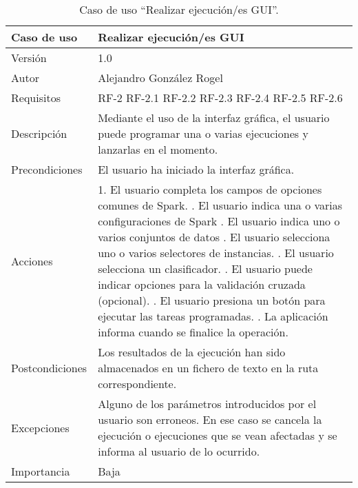  
\begin{table}
  \begin{center}
   \begin{tabular}{|>{} L{3cm} | L{9cm} |}
    \hline
    Caso de uso & Realizar ejecución/es GUI\\
    \hline
    Versión & 1.0 \\
    \hline
    Autor & Alejandro González Rogel \\
    \hline
    Requisitos & 
    		RF-2\newline
    		RF-2.1\newline
		RF-2.2\newline
		RF-2.3\newline
		RF-2.4\newline
		RF-2.5\newline
		RF-2.6\\
    \hline
    Descripción & Mediante el uso de la interfaz gráfica, el usuario puede programar una o varias ejecuciones y lanzarlas en el momento.\\
    \hline
    Precondiciones & El usuario ha iniciado la interfaz gráfica. \\
    \hline
    Acciones & 1. El usuario completa los campos de opciones comunes de Spark. . El usuario indica una o varias configuraciones de Spark . El usuario indica uno o varios conjuntos de datos . El usuario selecciona uno o varios selectores de instancias. . El usuario selecciona un clasificador. . El usuario puede indicar opciones para la validación cruzada (opcional). . El usuario presiona un botón para ejecutar las tareas programadas. . La aplicación informa cuando se finalice la operación.
    			   \\
    \hline
    Postcondiciones & Los resultados de la ejecución han sido almacenados en un fichero de texto en la ruta correspondiente. \\
    \hline
    Excepciones & Alguno de los parámetros introducidos por el usuario son erroneos. En ese caso se cancela la ejecución o ejecuciones que se vean afectadas y se informa al usuario de lo ocurrido. \\
    \hline
    Importancia & Baja \\
    \hline
   \end{tabular}
   \caption{Caso de uso ``Realizar ejecución/es GUI''.}
   \label{tabla:casoUso2}
  \end{center}
 \end{table} 
 
